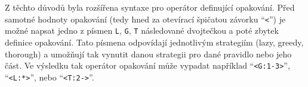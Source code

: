 Z těchto důvodů byla rozšířena syntaxe pro operátor definující opakování.
Před samotné hodnoty opakování (tedy hned za otevírací špičatou závorku \enquote{\texttt{<}}) je možné napsat
jedno z písmen \texttt{L}, \texttt{G}, \texttt{T} následované dvojtečkou a poté zbytek definice opakování.
Tato písmena odpovídají jednotlivým strategiím (lazy, greedy, thorough) a umožňují tak vynutit danou strategii pro dané pravidlo nebo jeho část.
Ve výsledku tak operátor opakování může vypadat například \enquote{\texttt{<G:1-3>}}, \enquote{\texttt{<L:*>}}, nebo \enquote{\texttt{<T:2->}}.
